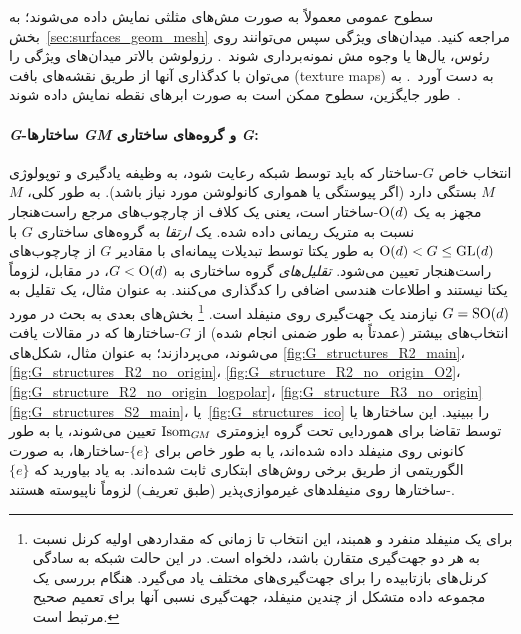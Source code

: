 سطوح عمومی معمولاً به صورت مش‌های مثلثی نمایش داده می‌شوند؛ به بخش~\ref{sec:surfaces_geom_mesh} مراجعه کنید.
میدان‌های ویژگی سپس می‌توانند روی رئوس، یال‌ها یا وجوه مش نمونه‌برداری شوند~\cite{deGoes2016VectorFieldProcessing}.
رزولوشن بالاتر میدان‌های ویژگی را می‌توان با کدگذاری آنها از طریق نقشه‌های بافت (texture maps) به دست آورد~\cite{li2019crossAtlas,huang2019texturenet}.
به طور جایگزین، سطوح ممکن است به صورت ابرهای نقطه نمایش داده شوند~\cite{tatarchenko2018tangent,jin2019NPTCnet}.

\paragraph{\textit{G}-ساختارها \textit{GM} و گروه‌های ساختاری \textit{G}:}
انتخاب خاص $G$-ساختار که باید توسط شبکه رعایت شود، به وظیفه یادگیری و توپولوژی $M$ بستگی دارد (اگر پیوستگی یا همواری کانولوشن مورد نیاز باشد).
به طور کلی، $M$ مجهز به یک $\operatorname{O}(d)$-ساختار است، یعنی یک کلاف از چارچوب‌های مرجع راست‌هنجار نسبت به متریک ریمانی داده شده.
یک \emph{ارتقا} به گروه‌های ساختاری $G$ با ${\operatorname{O}(d) < G \leq \operatorname{GL}(d)}$ به طور یکتا توسط تبدیلات پیمانه‌ای با مقادیر $G$ از چارچوب‌های راست‌هنجار تعیین می‌شود.
\emph{تقلیل‌های} گروه ساختاری به $G < \operatorname{O}(d)$، در مقابل، لزوماً یکتا نیستند و اطلاعات هندسی اضافی را کدگذاری می‌کنند.
به عنوان مثال، یک تقلیل به $G=\operatorname{SO}(d)$ نیازمند یک جهت‌گیری روی منیفلد است.%
\footnote{
	برای یک منیفلد منفرد و همبند، این انتخاب تا زمانی که مقداردهی اولیه کرنل نسبت به هر دو جهت‌گیری متقارن باشد، دلخواه است.
	در این حالت شبکه به سادگی کرنل‌های بازتابیده را برای جهت‌گیری‌های مختلف یاد می‌گیرد.
	هنگام بررسی یک مجموعه داده متشکل از چندین منیفلد، جهت‌گیری نسبی آنها برای تعمیم صحیح مرتبط است.
}
بخش‌های بعدی به بحث در مورد انتخاب‌های بیشتر (عمدتاً به طور ضمنی انجام شده) از $G$-ساختارها که در مقالات یافت می‌شوند، می‌پردازند؛ به عنوان مثال، شکل‌های
\ref{fig:G_structures_R2_main}،
\ref{fig:G_structures_R2_no_origin}،
\ref{fig:G_structure_R2_no_origin_O2}،
\ref{fig:G_structure_R2_no_origin_logpolar}،
\ref{fig:G_structure_R3_no_origin}
\ref{fig:G_structures_S2_main}،
یا~\ref{fig:G_structures_ico} را ببینید.
این ساختارها یا توسط تقاضا برای هموردایی تحت گروه ایزومتری $\operatorname{Isom}_{G\mkern-1.4muM}$ تعیین می‌شوند، یا به طور کانونی روی منیفلد داده شده‌اند، یا به طور خاص برای $\{e\}$-ساختارها، به صورت الگوریتمی از طریق برخی روش‌های ابتکاری ثابت شده‌اند.
به یاد بیاورید که $\{e\}$-ساختارها روی منیفلدهای غیرموازی‌پذیر (طبق تعریف) لزوماً ناپیوسته هستند.

